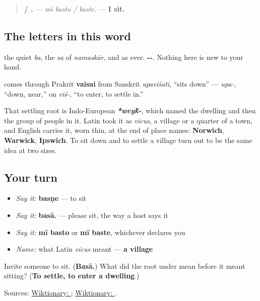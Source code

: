 \begin{quote}
\textbf{  / .} — \emph{mī basto / baste.} — \textbf{I sit.}
\end{quote}

\subsection*{The letters in this word}
\textbf{} the quiet \emph{ba}, \textbf{} the \emph{sa} of \emph{namaskār}, and \textbf{} as ever. \textbf{--}. Nothing here is new to your hand.

\begin{cousinweb}
\textbf{} comes through Prakrit \textbf{vaisai} from Sanskrit \textbf{} \emph{upaviśati}, \textquotedblleft{}sits down\textquotedblright{} — \textbf{} \emph{upa-}, \textquotedblleft{}down, near,\textquotedblright{} on \textbf{} \emph{viś-}, \textquotedblleft{}to enter, to settle in.\textquotedblright{}

That settling root is Indo-European \emph{\textbf{*wey\'{k}-}}, which named the dwelling and then the group of people in it. Latin took it as \emph{vīcus}, a village or a quarter of a town, and English carries it, worn thin, at the end of place names: \textbf{Norwich}, \textbf{Warwick}, \textbf{Ipswich}. To sit down and to settle a village turn out to be the same idea at two sizes.
\end{cousinweb}

\subsection*{Your turn}
\begin{itemize}
\raggedright
  \item \emph{Say it:} \textbf{basṇe} — to sit
  \item \emph{Say it:} \textbf{basā.} — please sit, the way a host says it
  \item \emph{Say it:} \textbf{mī basto} or \textbf{mī baste}, whichever declares you
  \item \emph{Name:} what Latin \emph{vīcus} meant — \textbf{a village}
\end{itemize}

\begin{tcolorbox}[breakable,colback=teal!4,colframe=teal!35!black,title={Before you move on}]
Invite someone to sit. (\textbf{Basā.}) What did the root under \textbf{} mean before it meant sitting? (\textbf{To settle, to enter a dwelling}.)

Sources: \href{https://en.wiktionary.org/wiki/\%E0\%A4\%AC\%E0\%A4\%B8\%E0\%A4\%A3\%E0\%A5\%87}{Wiktionary: }; \href{https://en.wiktionary.org/wiki/\%E0\%A4\%B5\%E0\%A4\%BF\%E0\%A4\%B6\%E0\%A5\%8D}{Wiktionary: }.
\end{tcolorbox}
